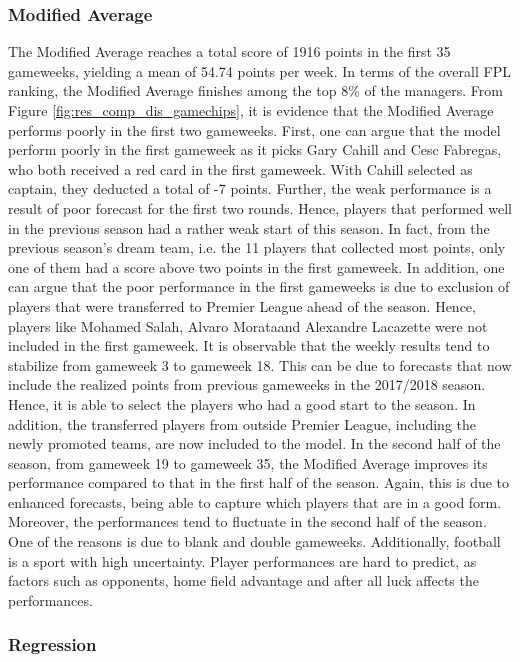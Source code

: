 \subsubsection{Modified Average}
The Modified Average reaches a total score of 1916 points in the first 35 gameweeks, yielding a mean of 54.74 points per week. In terms of the overall FPL ranking, the Modified Average finishes among the top 8\% of the managers. 
\newpar
From Figure \ref{fig:res_comp_dis_gamechips}, it is evidence that the Modified Average performs poorly in the first two gameweeks. First, one can argue that the model perform poorly in the first gameweek as it picks Gary Cahill and Cesc Fabregas, who both received a red card in the first gameweek.  With Cahill selected as captain, they deducted a total of -7 points. Further, the weak performance is a result of poor forecast for the first two rounds. Hence, players that performed well in the previous season had a rather weak start of this season. In fact, from the previous season’s dream team, i.e.  the 11 players that collected most points, only one of them had a score above two points in the first gameweek. In addition, one can argue that the poor performance in the first gameweeks is due to exclusion of players that were transferred to Premier League ahead of the season. Hence, players like Mohamed Salah, Alvaro Morataand Alexandre Lacazette were not included in the first gameweek.
\newpar
It is observable that the weekly results tend to stabilize from gameweek 3 to gameweek 18. This can be due to forecasts that now include the realized points from previous gameweeks in the 2017/2018 season. Hence, it is able to select the players who had a good start to the season. In addition, the transferred players from outside Premier League, including the newly promoted teams, are now included to the model. 
\newpar
In the second half of the season, from gameweek 19 to gameweek 35, the Modified Average improves its performance compared to that in the first half of the season. Again, this is due to enhanced forecasts, being able to capture which players that are in a good form. Moreover, the performances tend to fluctuate in the second half of the season. One of the reasons is due to blank and double gameweeks. Additionally, football is a sport with high uncertainty. Player performances are hard to predict, as factors such as opponents, home field advantage and after all luck affects the performances.  


\subsubsection{Regression}

